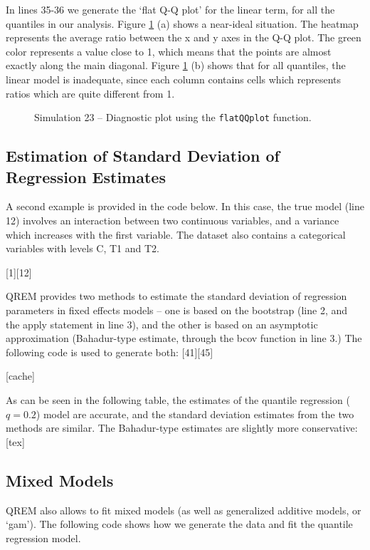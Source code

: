 \documentclass[a4paper,10pt]{article}
\begin{document}
In lines 35-36 we generate the `flat Q-Q plot' for the linear term, for all the quantiles in our analysis. Figure \ref{sim23flatqq} (a) shows a near-ideal situation. The heatmap represents the average ratio between the x and y axes in the Q-Q plot. The green color represents a value close to 1, which means that the points are almost exactly along the main diagonal. Figure \ref{sim23flatqq} (b) shows that for all quantiles, the linear model is inadequate, since each column contains cells which represents ratios which are quite different from 1.

\begin{figure}[b!]
\centering
{}
\caption{Simulation 23 -- Diagnostic plot using the \texttt{flatQQplot} function.}\label{sim23flatqq}
\end{figure}


\subsection{Estimation of Standard Deviation of Regression Estimates}

A second example is provided in the code below. In this case, the true model (line 12) involves an interaction between two continuous variables, and a variance which increases with the first variable. The dataset also contains a categorical variables with levels C, T1 and T2. 

[1][12]

QREM provides two methods to estimate the standard deviation of regression parameters in fixed effects models -- one is based on the bootstrap (line 2, and the apply statement in line 3), and the other is based on an asymptotic approximation (Bahadur-type estimate, through the bcov function in line 3.) The following code is used to generate both:
[41][45]

[cache]

As can be seen in the following table, the estimates of the quantile regression ($q=0.2$) model are accurate, and the standard deviation estimates from the two methods are similar. The Bahadur-type estimates are slightly more conservative:
 [tex]	

\subsection{Mixed Models}
QREM also allows to fit mixed models (as well as generalized additive models, or `gam'). The following code shows how we generate the data and fit the quantile regression model. 
\end{document}
